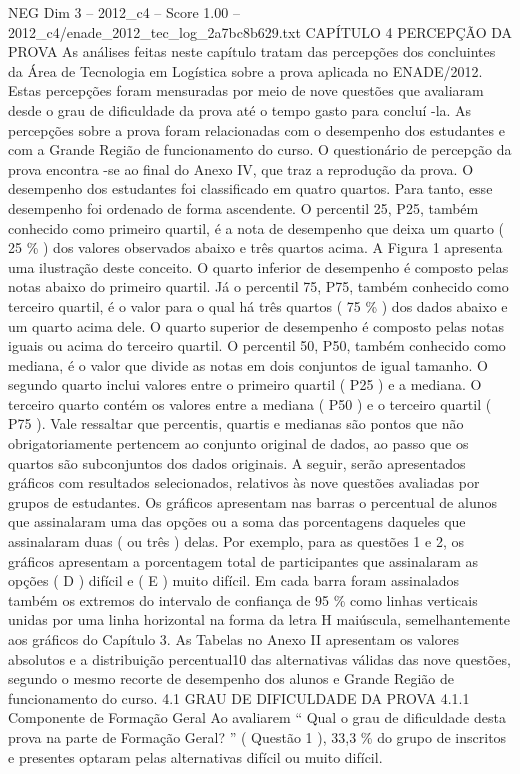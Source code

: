 \begin{textsample}{NEG Dim 3 – 2012\_c4 – Score 1.00 – 2012\_c4/enade\_2012\_tec\_log\_2a7bc8b629.txt}  \label{ex:f3_neg_129}
CAPÍTULO 4 PERCEPÇÃO DA PROVA As análises feitas neste capítulo tratam das percepções dos concluintes da Área de Tecnologia em Logística sobre a prova aplicada no ENADE/2012.
Estas percepções foram mensuradas por meio de nove questões que avaliaram desde o grau de dificuldade da prova até o tempo gasto para concluí -la.
As percepções sobre a prova foram relacionadas com o desempenho dos estudantes e com a Grande Região de funcionamento do curso.
O questionário de percepção da prova encontra -se ao final do Anexo IV, que traz a reprodução da prova.
O desempenho dos estudantes foi classificado em quatro quartos.
Para tanto, esse desempenho foi ordenado de forma ascendente.
O percentil 25, P25, também conhecido como primeiro quartil, é a nota de desempenho que deixa um quarto ( 25 \% ) dos valores observados abaixo e três quartos acima.
A Figura 1 apresenta uma ilustração deste conceito.
O quarto inferior de desempenho é composto pelas notas abaixo do primeiro quartil.
Já o percentil 75, P75, também conhecido como terceiro quartil, é o valor para o qual há três quartos ( 75 \% ) dos dados abaixo e um quarto acima dele.
O quarto superior de desempenho é composto pelas notas iguais ou acima do terceiro quartil.
O percentil 50, P50, também conhecido como mediana, é o valor que divide as notas em dois conjuntos de igual tamanho.
O segundo quarto inclui valores entre o primeiro quartil ( P25 ) e a mediana.
O terceiro quarto contém os valores entre a mediana ( P50 ) e o terceiro quartil ( P75 ).
Vale ressaltar que percentis, quartis e medianas são pontos que não obrigatoriamente pertencem ao conjunto original de dados, ao passo que os quartos são subconjuntos dos dados originais.
A seguir, serão apresentados gráficos com resultados selecionados, relativos às nove questões avaliadas por grupos de estudantes.
Os gráficos apresentam nas barras o percentual de alunos que assinalaram uma das opções ou a soma das porcentagens daqueles que assinalaram duas ( ou três ) delas.
Por exemplo, para as questões 1 e 2, os gráficos apresentam a porcentagem total de participantes que assinalaram as opções ( D ) difícil e ( E ) muito difícil.
Em cada barra foram assinalados também os extremos do intervalo de confiança de 95 \% como linhas verticais unidas por uma linha horizontal na forma da letra H maiúscula, semelhantemente aos gráficos do Capítulo 3.
As Tabelas no Anexo II apresentam os valores absolutos e a distribuição percentual10 das alternativas válidas das nove questões, segundo o mesmo recorte de desempenho dos alunos e Grande Região de funcionamento do curso. 4.1 GRAU DE DIFICULDADE DA PROVA 4.1.1 Componente de Formação Geral Ao avaliarem “ Qual o grau de dificuldade desta prova na parte de Formação Geral? ” ( Questão 1 ), 33,3 \% do grupo de inscritos e presentes optaram pelas alternativas difícil ou muito difícil.

\end{textsample}
